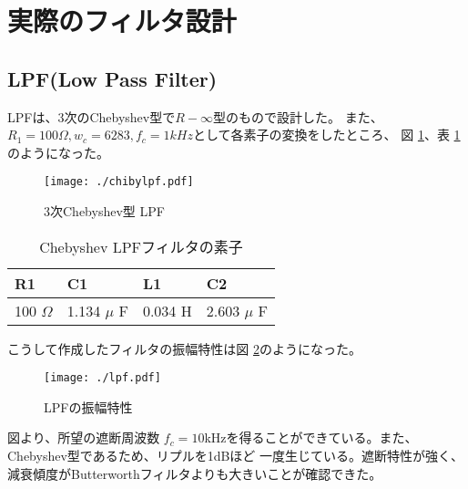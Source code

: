 \documentclass[a4j,twocolumn]{jsarticle}
\begin{document}
\section{実際のフィルタ設計}

\subsection{LPF(Low Pass Filter)}
LPFは、3次のChebyshev型で$R-\infty 型$のもので設計した。
また、$R_{1} = 100\Omega, w_{c} = 6283, f_{c} = 1kHz$として各素子の変換をしたところ、
図 \ref{lpf}、表 \ref{lpfhyou}のようになった。
\begin{figure}[H]
    \centering
   \texttt{[image: ./chibylpf.pdf]}
   \caption{3次Chebyshev型 LPF}
    \label{lpf}
\end{figure}
\begin{table}
    \centering
    \caption{Chebyshev LPFフィルタの素子}
    \begin{tabular}{@{}llll@{}} \toprule
    R1 & C1 & L1 & C2  \\ \midrule
    100 $\Omega$ & 1.134 $\mu$ F & 0.034 H & 2.603 $\mu$ F \\ \bottomrule
    \end{tabular} 
    \label{lpfhyou}
\end{table}

こうして作成したフィルタの振幅特性は図 \ref{lpfs}のようになった。
\begin{figure}[H]
    \centering
   \texttt{[image: ./lpf.pdf]}
   \caption{LPFの振幅特性}
    \label{lpfs}
\end{figure}
図より、所望の遮断周波数 $f_{c} = 10$kHzを得ることができている。また、Chebyshev型であるため、リプルを1dBほど
一度生じている。遮断特性が強く、減衰傾度がButterworthフィルタよりも大きいことが確認できた。
\end{document}
